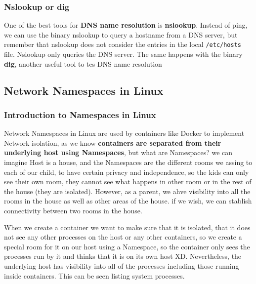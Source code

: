 \documentclass{article}
\begin{document}
\subsubsection{Nslookup or dig}
One of the best tools for \textbf{DNS name resolution} is \textbf{nslookup}. Instead of ping, we can use the binary nslookup to query a hostname from a DNS server, but remember that nslookup does not consider the entries in the local \verb|/etc/hosts| file. Nslookup only queries the DNS server. The same happens with the binary \textbf{dig}, another useful tool to tes DNS name resolution

\subsection{Network Namespaces in Linux}

\subsubsection{Introduction to Namespaces in Linux}

Network Namespaces in Linux are used by containers like Docker to implement Network isolation, as we know \textbf{containers are separated from their underlying host using Namespaces}, but what are Namespaces? we can imagine Host is a house, and the Namespaces are the different rooms we assing to each of our child, to have certain privacy and independence, so the kids can only see their own room, they cannot see what happens in other room or in the rest of the house (they are isolated). However, as a parent, we ahve visibility into all the rooms in the house as well as other areas of the house. if we wish, we can stablish connectivity between two rooms in the house.

When we create a container we want to make sure that it is isolated, that it does not see any other processes on the host or any other containers, so we create a special room for it on our host using a Namespace, so the container only sees the processes run by it and thinks that it is on its own host XD. Nevertheless, the underlying host has visibility into all of the processes including those running inside containers. This can be seen listing system processes.
\end{document}
